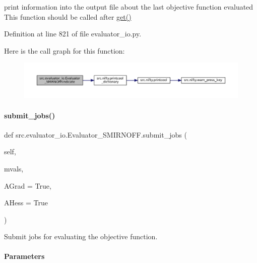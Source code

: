 print information into the output file about the last objective function evaluated This function should be called after \hyperlink{classsrc_1_1evaluator__io_1_1Evaluator__SMIRNOFF_a609eeee4162c7b26fa40ff0df3eff104}{get()} 



Definition at line 821 of file evaluator\+\_\+io.\+py.

Here is the call graph for this function\+:
\nopagebreak
\begin{figure}[H]
\begin{center}
\leavevmode
\includegraphics[width=350pt]{classsrc_1_1evaluator__io_1_1Evaluator__SMIRNOFF_ac09d0d592c217a77684c8a20e8ae8cef_cgraph}
\end{center}
\end{figure}
\mbox{\label{classsrc_1_1evaluator__io_1_1Evaluator__SMIRNOFF_a27d6f29563811786b154b4c37d2ee845}} 
\paragraph{\texorpdfstring{submit\+\_\+jobs()}{submit\_jobs()}}
{\footnotesize\ttfamily def src.\+evaluator\+\_\+io.\+Evaluator\+\_\+\+S\+M\+I\+R\+N\+O\+F\+F.\+submit\+\_\+jobs (\begin{DoxyParamCaption}\item[{}]{self,  }\item[{}]{mvals,  }\item[{}]{A\+Grad = {\ttfamily True},  }\item[{}]{A\+Hess = {\ttfamily True} }\end{DoxyParamCaption})}



Submit jobs for evaluating the objective function. 

\paragraph*{Parameters }

